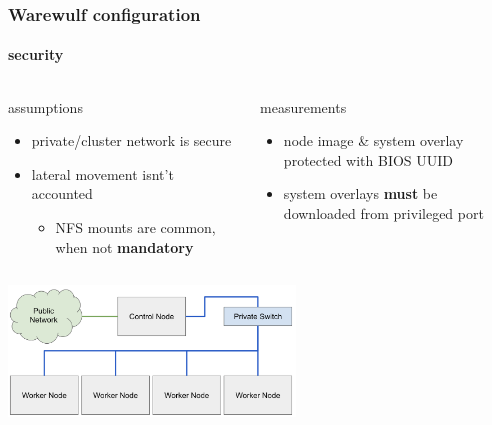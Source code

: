 \documentclass[aspectratio=169]{beamer}
\begin{document}
\begin{frame}[fragile]
\frametitle{Warewulf configuration}
\framesubtitle{security}
\begin{columns}
\begin{block}{assumptions}
  \begin{itemize}
    \item private/cluster network is secure
    \item lateral movement isnt't accounted
    \begin{itemize}
      \item NFS mounts are common, when not \textbf{mandatory}
    \end{itemize}
  \end{itemize}
\end{block}
\begin{block}{measurements}
  \begin{itemize}
    \item node image \& system overlay protected with BIOS UUID
    \item system overlays \textbf{must} be downloaded from privileged port
  \end{itemize}
\end{block}
\end{columns}
\includegraphics[height=3.5cm]{beowulf_architecture}
\end{frame}
\end{document}
